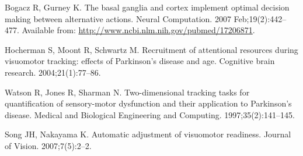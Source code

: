 \documentclass[10pt,letterpaper]{article}
\begin{document}
\begin{thebibliography}{10}
Bogacz R, Gurney K.
\newblock The basal ganglia and cortex implement optimal decision making
  between alternative actions.
\newblock Neural Computation. 2007 Feb;19(2):442--477.
\newblock Available from: \url{http://www.ncbi.nlm.nih.gov/pubmed/17206871}.

Hocherman S, Moont R, Schwartz M.
\newblock Recruitment of attentional resources during visuomotor tracking:
  effects of {Parkinson}'s disease and age.
\newblock Cognitive brain research. 2004;21(1):77--86.

Watson R, Jones R, Sharman N.
\newblock Two-dimensional tracking tasks for quantification of sensory-motor
  dysfunction and their application to {Parkinson}'s disease.
\newblock Medical and Biological Engineering and Computing.
  1997;35(2):141--145.

Song JH, Nakayama K.
\newblock Automatic adjustment of visuomotor readiness.
\newblock Journal of Vision. 2007;7(5):2--2.

\end{thebibliography}
\end{document}
